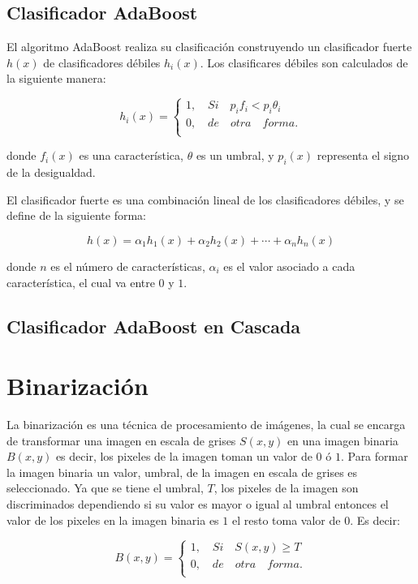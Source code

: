 \subsection{Clasificador AdaBoost}\label{subsec:AdaboostClasifier}  

El algoritmo AdaBoost realiza su clasificación construyendo un clasificador fuerte $h(x)$ de clasificadores débiles $h_i(x)$. Los clasificares débiles son calculados de la siguiente manera: 

$$h_i(x)=
\begin{cases}   
1, \quad Si \quad  p_if_i<p_i \theta_i \\
0, \quad de \quad otra \quad forma.\\
\end{cases}$$

donde $f_i(x)$ es una característica, $\theta$ es un umbral, y $p_i(x)$ representa el signo de la desigualdad.   

El clasificador fuerte es una combinación lineal de los clasificadores débiles, y se define de la siguiente forma: 

$$h(x)= \alpha_1h_1(x)+\alpha_2h_2(x)+ \cdots +\alpha_nh_n(x)$$ 

donde $n$ es el n\'umero de características, $\alpha_i$ es el valor asociado a cada característica, el cual va entre $0$ y $1$.


\subsection{Clasificador AdaBoost en Cascada}\label{subsec:AdaboostCascade}   


\section{Binarización}\label{Binarization} 

La binarización es una técnica de procesamiento de imágenes, la cual se encarga de transformar una imagen en escala de grises $S(x,y)$ en una imagen binaria $B(x,y)$ es decir, los pixeles de la imagen toman un valor de $0$ ó $1$.   
Para formar la imagen binaria un valor, umbral, de la imagen en escala de grises es seleccionado. Ya que se tiene el umbral, $T$,     
los pixeles de la imagen son discriminados dependiendo si su valor es mayor o igual al umbral entonces el valor de los pixeles en la imagen binaria es $1$ el resto toma valor de $0$. Es decir: 

$$B(x,y)=
\begin{cases}   
1, \quad Si \quad  S(x,y)\geq T \\
0, \quad de \quad otra \quad forma.\\
\end{cases}$$

